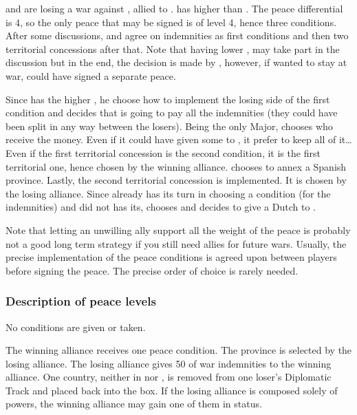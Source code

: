 \begin{exemple}[Disagreement]
  \HIS and \HOL are losing a war against \FRA, allied to \paysPortugal. \HOL
  has higher \DIP than \HIS. The peace differential is 4, so the only peace
  that may be signed is of level 4, hence three conditions. After some
  discussions, \FRA and \HOL agree on indemnities as first conditions and then
  two territorial concessions after that. Note that having lower \DIP, \HIS
  may take part in the discussion but in the end, the decision is made by
  \HOL, however, if \HOL wanted to stay at war, \HIS could have signed a
  separate peace.

  Since \HOL has the higher \DIP, he choose how to implement the losing side
  of the first condition and decides that \HIS is going to pay all the
  indemnities (they could have been split in any way between the
  losers). Being the only Major, \FRA chooses who receive the money. Even if
  it could have given some to \paysPortugal, it prefer to keep all of it\ldots
  Even if the first territorial concession is the second condition, it is the
  first territorial one, hence chosen by the winning alliance. \FRA chooses to
  annex a Spanish province. Lastly, the second territorial concession is
  implemented. It is chosen by the losing alliance. Since \HOL already has its
  turn in choosing a condition (for the indemnities) and \HIS did not has its,
  \HIS chooses and decides to give a Dutch \COL to \paysPortugal.

  Note that letting an unwilling ally support all the weight of the peace is
  probably not a good long term strategy if you still need allies for future
  wars. Usually, the precise implementation of the peace conditions is agreed
  upon between players before signing the peace. The precise order of choice
  is rarely needed.
\end{exemple}

\subsubsection{Description of peace levels}
 No conditions are given or taken.

 The winning alliance receives one peace condition.
 The province is selected by the losing
alliance.
\bparag[Indemnities] The losing alliance gives 50 \ducats of war indemnities
to the winning alliance.
 One country, neither in \VASSAL nor
\ANNEXION, is removed from one loser's Diplomatic Track and placed back into
the \Neutral box. If the losing alliance is composed solely of \MIN powers,
the winning alliance may gain one of them in \MR status. 


